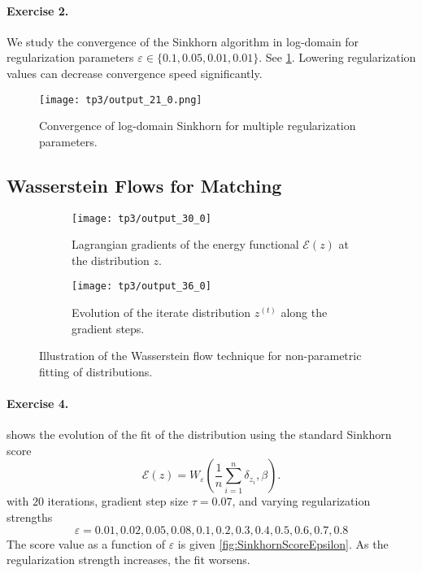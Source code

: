 \documentclass{article}
\newcommand{\calE}{\mathcal{E}}
\renewcommand{\epsilon}{\varepsilon}
\numberwithin{equation}{section}
\theoremstyle{definition}
\begin{document}
\paragraph{Exercise 2.} We study the convergence of the Sinkhorn algorithm in log-domain for regularization parameters $\epsilon \in \{0.1, 0.05, 0.01, 0.01\}$. See \cref{fig:tp3output210}. Lowering regularization values can decrease convergence speed significantly.
\begin{figure}[!h]
	\centering
	\texttt{[image: tp3/output\_21\_0.png]}
	\caption{Convergence of log-domain Sinkhorn for multiple regularization parameters.}
	\label{fig:tp3output210}
\end{figure}



\subsection{Wasserstein Flows for Matching}

\begin{figure}[!h]
	\begin{subfigure}{.4\linewidth}
		\centering
		\texttt{[image: tp3/output\_30\_0]}
		\caption{Lagrangian gradients of the energy functional $\calE(z)$ at the distribution $z$.}
		\label{fig:tp3output300}
	\end{subfigure}
	\begin{subfigure}{.59\linewidth}
		\centering
		\texttt{[image: tp3/output\_36\_0]}
		\caption{Evolution of the iterate distribution $z^{(t)}$ along the gradient steps.}
		\label{fig:tp3output360}
	\end{subfigure}
	\caption{Illustration of the Wasserstein flow technique for non-parametric fitting of distributions.}
\end{figure}


\paragraph{Exercise 4.}  shows the evolution of the fit of the distribution using the standard Sinkhorn score
\[
	\calE(z) = W_\epsilon\left(\frac{1}{n}\sum_{i=1}^n \delta_{z_i}, \beta\right).
\]
with $20$ iterations, gradient step size $\tau = 0.07$, and varying regularization strengths 
\[
	\epsilon = 0.01, 0.02, 0.05, 0.08, 0.1, 0.2, 0.3, 0.4, 0.5, 0.6, 0.7, 0.8
\]
The score value as a function of $\epsilon$ is given \cref{fig:SinkhornScoreEpsilon}. As the regularization strength increases, the fit worsens.
\end{document}
